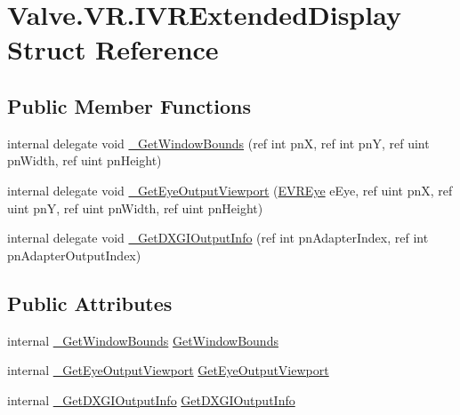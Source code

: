 \hypertarget{struct_valve_1_1_v_r_1_1_i_v_r_extended_display}{}\section{Valve.\+V\+R.\+I\+V\+R\+Extended\+Display Struct Reference}
\label{struct_valve_1_1_v_r_1_1_i_v_r_extended_display}
\subsection*{Public Member Functions}
\begin{DoxyCompactItemize}
\item 
internal delegate void \mbox{\hyperlink{struct_valve_1_1_v_r_1_1_i_v_r_extended_display_a9273a15728f289995559c641c25e8b1a}{\+\_\+\+Get\+Window\+Bounds}} (ref int pnX, ref int pnY, ref uint pn\+Width, ref uint pn\+Height)
\item 
internal delegate void \mbox{\hyperlink{struct_valve_1_1_v_r_1_1_i_v_r_extended_display_a6ef6cdc29a98eecafad06a70ee92e481}{\+\_\+\+Get\+Eye\+Output\+Viewport}} (\mbox{\hyperlink{namespace_valve_1_1_v_r_a8153d4a3e627e1cede046327087c1880}{E\+V\+R\+Eye}} e\+Eye, ref uint pnX, ref uint pnY, ref uint pn\+Width, ref uint pn\+Height)
\item 
internal delegate void \mbox{\hyperlink{struct_valve_1_1_v_r_1_1_i_v_r_extended_display_a9d769bf9d8aed92f33ae50770ece270f}{\+\_\+\+Get\+D\+X\+G\+I\+Output\+Info}} (ref int pn\+Adapter\+Index, ref int pn\+Adapter\+Output\+Index)
\end{DoxyCompactItemize}
\subsection*{Public Attributes}
\begin{DoxyCompactItemize}
\item 
internal \mbox{\hyperlink{struct_valve_1_1_v_r_1_1_i_v_r_extended_display_a9273a15728f289995559c641c25e8b1a}{\+\_\+\+Get\+Window\+Bounds}} \mbox{\hyperlink{struct_valve_1_1_v_r_1_1_i_v_r_extended_display_a3ca296a728b87db0af631ce1e8d746d6}{Get\+Window\+Bounds}}
\item 
internal \mbox{\hyperlink{struct_valve_1_1_v_r_1_1_i_v_r_extended_display_a6ef6cdc29a98eecafad06a70ee92e481}{\+\_\+\+Get\+Eye\+Output\+Viewport}} \mbox{\hyperlink{struct_valve_1_1_v_r_1_1_i_v_r_extended_display_a2d0398be7e722cb3f152fd5071431803}{Get\+Eye\+Output\+Viewport}}
\item 
internal \mbox{\hyperlink{struct_valve_1_1_v_r_1_1_i_v_r_extended_display_a9d769bf9d8aed92f33ae50770ece270f}{\+\_\+\+Get\+D\+X\+G\+I\+Output\+Info}} \mbox{\hyperlink{struct_valve_1_1_v_r_1_1_i_v_r_extended_display_a0d53c22564e05296b15062b11464530d}{Get\+D\+X\+G\+I\+Output\+Info}}
\end{DoxyCompactItemize}


